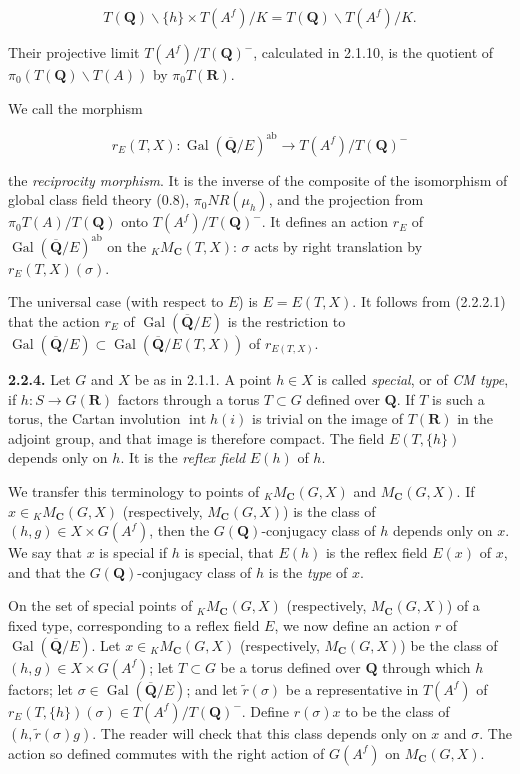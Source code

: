 \documentclass[10pt,a4paper]{article}
\begin{document}
\[
T(\mathbf Q)\backslash\{h\}\times T(A^f)/K=T(\mathbf Q)\backslash T(A^f)/K.
\]

Their projective limit \(T(A^f)/T(\mathbf Q)^{-}\), calculated in 2.1.10, is the quotient of \(\pi_0(T(\mathbf Q)\backslash T(A))\) by \(\pi_0T(\mathbf R)\).

We call the morphism

\[
r_E(T,X):\operatorname{Gal}(\overline{\mathbf Q}/E)^{\mathrm{ab}}\to T(A^f)/T(\mathbf Q)^{-}
\]

the \emph{reciprocity morphism}. It is the inverse of the composite of the isomorphism of global class field theory (0.8), \(\pi_0NR(\mu_h)\), and the projection from \(\pi_0T(A)/T(\mathbf Q)\) onto \(T(A^f)/T(\mathbf Q)^{-}\). It defines an action \(r_E\) of \(\operatorname{Gal}(\overline{\mathbf Q}/E)^{\mathrm{ab}}\) on the \({}_K M_{\mathbf C}(T,X)\): \(\sigma\) acts by right translation by \(r_E(T,X)(\sigma)\).

The universal case (with respect to \(E\)) is \(E=E(T,X)\). It follows from (2.2.2.1) that the action \(r_E\) of \(\operatorname{Gal}(\overline{\mathbf Q}/E)\) is the restriction to \(\operatorname{Gal}(\overline{\mathbf Q}/E)\subset\operatorname{Gal}(\overline{\mathbf Q}/E(T,X))\) of \(r_{E(T,X)}\).

\textbf{2.2.4.} Let \(G\) and \(X\) be as in 2.1.1. A point \(h\in X\) is called \emph{special}, or of \emph{CM type}, if \(h:S\to G(\mathbf R)\) factors through a torus \(T\subset G\) defined over \(\mathbf Q\). If \(T\) is such a torus, the Cartan involution \(\operatorname{int}h(i)\) is trivial on the image of \(T(\mathbf R)\) in the adjoint group, and that image is therefore compact. The field \(E(T,\{h\})\) depends only on \(h\). It is the \emph{reflex field} \(E(h)\) of \(h\).

We transfer this terminology to points of \({}_K M_{\mathbf C}(G,X)\) and \(M_{\mathbf C}(G,X)\). If \(x\in{}_K M_{\mathbf C}(G,X)\) (respectively, \(M_{\mathbf C}(G,X)\)) is the class of \((h,g)\in X\times G(A^f)\), then the \(G(\mathbf Q)\)-conjugacy class of \(h\) depends only on \(x\). We say that \(x\) is special if \(h\) is special, that \(E(h)\) is the reflex field \(E(x)\) of \(x\), and that the \(G(\mathbf Q)\)-conjugacy class of \(h\) is the \emph{type} of \(x\).

On the set of special points of \({}_K M_{\mathbf C}(G,X)\) (respectively, \(M_{\mathbf C}(G,X)\)) of a fixed type, corresponding to a reflex field \(E\), we now define an action \(r\) of \(\operatorname{Gal}(\overline{\mathbf Q}/E)\). Let \(x\in{}_K M_{\mathbf C}(G,X)\) (respectively, \(M_{\mathbf C}(G,X)\)) be the class of \((h,g)\in X\times G(A^f)\); let \(T\subset G\) be a torus defined over \(\mathbf Q\) through which \(h\) factors; let \(\sigma\in\operatorname{Gal}(\overline{\mathbf Q}/E)\); and let \(\widetilde r(\sigma)\) be a representative in \(T(A^f)\) of \(r_E(T,\{h\})(\sigma)\in T(A^f)/T(\mathbf Q)^{-}\). Define \(r(\sigma)x\) to be the class of \((h,\widetilde r(\sigma)g)\). The reader will check that this class depends only on \(x\) and \(\sigma\). The action so defined commutes with the right action of \(G(A^f)\) on \(M_{\mathbf C}(G,X)\).
\end{document}

